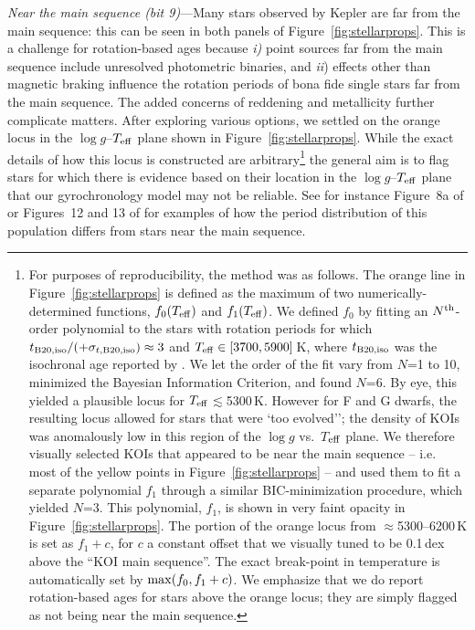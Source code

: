 \documentclass[11pt,twocolumn,tighten]{aastex63}
\begin{document}
{\it Near the main sequence (bit 9)}---Many stars observed by Kepler
are far from the main sequence: this can be seen in both panels of
Figure~\ref{fig:stellarprops}.  This is a challenge for rotation-based
ages because {\it i)} point sources far from the main sequence include
unresolved photometric binaries, and {\it ii}) effects other than
magnetic braking influence the rotation periods of bona fide single
stars far from the main sequence.  The added concerns of
reddening and metallicity further complicate matters.  After exploring
various options, we settled on the orange locus in the $\log
g$--$T_{\rm eff}$ plane shown in Figure~\ref{fig:stellarprops}.  While
the exact details of how this locus is constructed are arbitrary\footnote{For purposes of reproducibility, 
	the method was as follows.
The orange line in Figure~\ref{fig:stellarprops} is	defined as
the maximum of two numerically-determined functions, $f_0(T_{\rm eff})$ and $f_1(T_{\rm eff})$.
We defined $f_0$ by fitting an
$N^{\rm th}$-order polynomial to the stars with rotation periods for which $t_{\rm
B20,iso}/(+\sigma_{t,{\rm B20,iso}})\approx 3$
and $T_{\rm eff}\in[3700,5900]$\,K, where
$t_{\rm B20,iso}$ was the isochronal age reported by
\citet{Berger_2020a_catalog}.  We let the order of the fit vary from
$N$=1 to 10, minimized the Bayesian Information Criterion,
and found $N$=6.  
By eye, this yielded a plausible locus for $T_{\rm eff}$$\lesssim$5300\,K.
However for F and G dwarfs, the resulting locus
allowed for stars that were `too evolved''; the density of KOIs 
was anomalously low in this region of the $\log g$ vs.\ $T$$_{\rm eff}$ plane.
We therefore visually selected KOIs that appeared
to be near the main sequence -- i.e.~ most of the yellow
points in Figure~\ref{fig:stellarprops} -- and used them to fit a separate
polynomial $f_1$ through a similar BIC-minimization procedure,
which yielded $N$=3.
This polynomial, $f_1$, is shown in very faint opacity in Figure~\ref{fig:stellarprops}.
The portion of the orange locus from $\approx$5300--6200\,K
is set as $f_1 + c$, for $c$ a constant offset that we visually tuned to be
0.1\,dex above the ``KOI main sequence''.
The exact break-point in temperature is automatically set by ${\rm max}(f_0, f_1+c)$.
We emphasize that we do report rotation-based ages for stars
above the orange locus;
they are simply flagged as not being near the main sequence.  }
the general aim is to flag stars for which there is evidence based on
their location in the $\log g$--$T_{\rm eff}$ plane that our
gyrochronology model may not be reliable.  
See for instance Figure~8a of \citet{2022AJ....164..137K} or
Figures~12 and 13 of \citet{2023ApJS..268....4F} for examples of how
the period distribution of this population differs from stars near the
main sequence.
\end{document}
